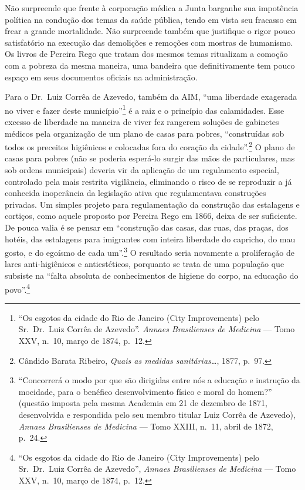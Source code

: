Não surpreende que frente à corporação médica a Junta barganhe sua
impotência política na condução dos temas da saúde pública, tendo em
vista seu fracasso em frear a grande mortalidade. Não surpreende também
que justifique o rigor pouco satisfatório na execução das demolições e
remoções com mostras de humanismo. Os livros de Pereira Rego que tratam
dos mesmos temas ritualizam a comoção com a pobreza da mesma maneira,
uma bandeira que definitivamente tem pouco espaço em seus documentos
oficiais na administração.

Para o Dr.~Luiz Corrêa de Azevedo, também da AIM, ``uma liberdade
exagerada no viver e fazer deste município''\footnote{``Os esgotos da
  cidade do Rio de Janeiro (City Improvements) pelo Sr.~Dr.~Luiz Corrêa
  de Azevedo''. \textit{Annaes Brasilienses de Medicina} --- Tomo XXV,
  n.~10, março de 1874, p.~12.} é a raiz e o princípio das calamidades.
Esse excesso de liberdade na maneira de viver fez rangerem soluções de
gabinetes médicos pela organização de um plano de casas para pobres,
``construídas sob todos os preceitos higiênicos e colocadas fora do
coração da cidade''.\footnote{Cândido Barata Ribeiro, \textit{Quais as
  medidas sanitárias\ldots{}}, 1877, p.~97.} O plano de casas para
pobres (não se poderia esperá-lo surgir das mãos de particulares, mas
sob ordens municipais) deveria vir da aplicação de um regulamento
especial, controlado pela mais restrita vigilância, eliminando o risco
de se reproduzir a já conhecida inoperância da legislação ativa que
regulamentava construções privadas. Um simples projeto para
regulamentação da construção das estalagens e cortiços, como aquele
proposto por Pereira Rego em 1866, deixa de ser suficiente. De pouca
valia é se pensar em ``construção das casas, das ruas, das praças, dos
hotéis, das estalagens para imigrantes com inteira liberdade do
capricho, do mau gosto, e do egoísmo de cada um''.\footnote{``Concorrerá
  o modo por que são dirigidas entre nós a educação e instrução da
  mocidade, para o benéfico desenvolvimento físico e moral do homem?''
  (questão imposta pela mesma Academia em 21 de dezembro de 1871,
  desenvolvida e respondida pelo seu membro titular Luiz Corrêa de
  Azevedo), \textit{Annaes Brasilienses de Medicina} --- Tomo XXIII, n.~11,
  abril de 1872, p.~24.} O resultado seria novamente a proliferação de
lares anti-higiênicos e antiestéticos, porquanto se trata de uma
população que subsiste na ``falta absoluta de conhecimentos de higiene
do corpo, na educação do povo''.\footnote{``Os esgotos da cidade do Rio
  de Janeiro (City Improvements) pelo Sr.~Dr.~Luiz Corrêa de Azevedo'',
  \textit{Annaes Brasilienses de Medicina} --- Tomo XXV, n.~10, março de
  1874, p.~12.}


